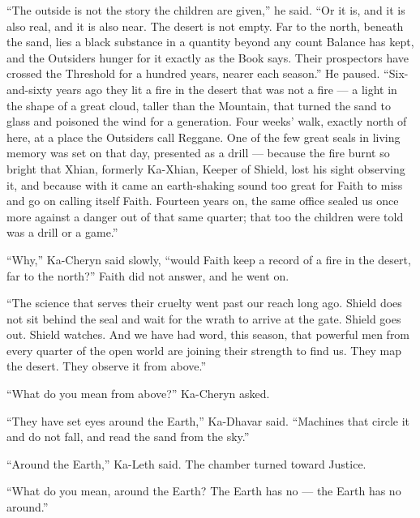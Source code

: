 ``The outside is not the story the children are given,'' he said. ``Or it is, and it is also real, and it is also near. The desert is not empty. Far to the north, beneath the sand, lies a black substance in a quantity beyond any count Balance has kept, and the Outsiders hunger for it exactly as the Book says. Their prospectors have crossed the Threshold for a hundred years, nearer each season.'' He paused. ``Six-and-sixty years ago they lit a fire in the desert that was not a fire --- a light in the shape of a great cloud, taller than the Mountain, that turned the sand to glass and poisoned the wind for a generation. Four weeks' walk, exactly north of here, at a place the Outsiders call Reggane. One of the few great seals in living memory was set on that day, presented as a drill --- because the fire burnt so bright that Xhian, formerly Ka-Xhian, Keeper of Shield, lost his sight observing it, and because with it came an earth-shaking sound too great for Faith to miss and go on calling itself Faith. Fourteen years on, the same office sealed us once more against a danger out of that same quarter; that too the children were told was a drill or a game.''\par

``Why,'' Ka-Cheryn said slowly, ``would Faith keep a record of a fire in the desert, far to the north?'' Faith did not answer, and he went on.\par

``The science that serves their cruelty went past our reach long ago. Shield does not sit behind the seal and wait for the wrath to arrive at the gate. Shield goes out. Shield watches. And we have had word, this season, that powerful men from every quarter of the open world are joining their strength to find us. They map the desert. They observe it from above.''\par

``What do you mean from above?'' Ka-Cheryn asked.\par

``They have set eyes around the Earth,'' Ka-Dhavar said. ``Machines that circle it and do not fall, and read the sand from the sky.''\par

\ornament

``Around the Earth,'' Ka-Leth said. The chamber turned toward Justice.\par

``What do you mean, around the Earth? The Earth has no --- the Earth has no around.''\par

